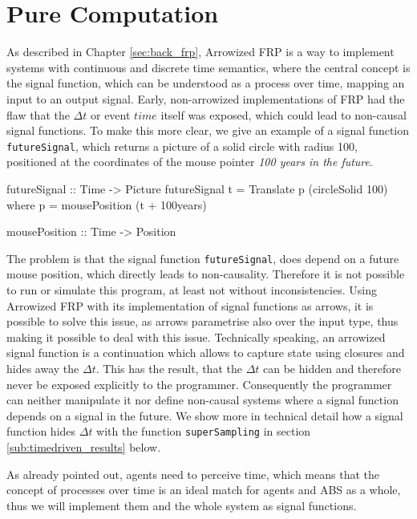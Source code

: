 \section{Pure Computation}
\label{sec:timedriven_firststep}
As described in Chapter \ref{sec:back_frp}, Arrowized FRP \cite{hughes_generalising_2000} is a way to implement systems with continuous and discrete time semantics, where the central concept is the signal function, which can be understood as a process over time, mapping an input to an output signal. Early, non-arrowized implementations of FRP had the flaw that the $\Delta t$ or event $time$ itself was exposed, which could lead to non-causal signal functions. To make this more clear, we give an example of a signal function \texttt{futureSignal}, which returns a picture of a solid circle with radius 100, positioned at the coordinates of the mouse pointer \textit{100 years in the future}.

\begin{HaskellCode}
futureSignal :: Time -> Picture
futureSignal t = Translate p (circleSolid 100)
  where
    p = mousePosition (t + 100years)

mousePosition :: Time -> Position
\end{HaskellCode}

The problem is that the signal function \texttt{futureSignal}, does depend on a future mouse position, which directly leads to non-causality. Therefore it is not possible to run or simulate this program, at least not without inconsistencies.
Using Arrowized FRP with its implementation of signal functions as arrows, it is possible to solve this issue, as arrows parametrise also over the input type, thus making it possible to deal with this issue. Technically speaking, an arrowized signal function is a continuation which allows to capture state using closures and hides away the $\Delta t$. This has the result, that the $\Delta t$ can be hidden and therefore never be exposed explicitly to the programmer. Consequently the programmer can neither manipulate it nor define non-causal systems where a signal function depends on a signal in the future. We show more in technical detail how a signal function hides $\Delta t$ with the function \texttt{superSampling} in section \ref{sub:timedriven_results} below.

\medskip

As already pointed out, agents need to perceive time, which means that the concept of processes over time is an ideal match for agents and ABS as a whole, thus we will implement them and the whole system as signal functions.

